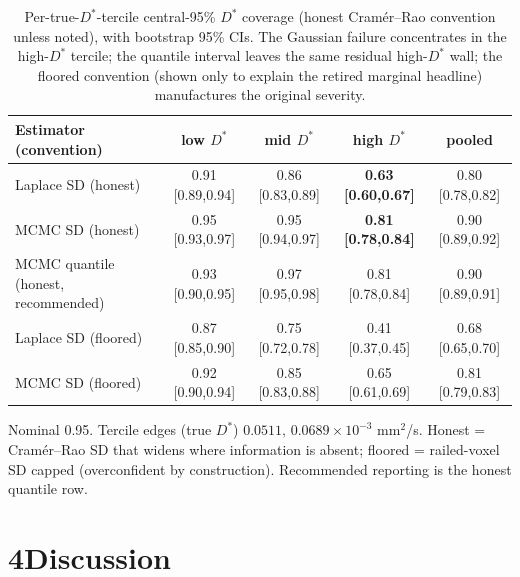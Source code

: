 \documentclass[11pt]{article}
\newcommand{\Dstar}{\ensuremath{D^{*}}}
\begin{document}
\begin{table}[htbp]
\centering
\caption{Per-true-\Dstar{}-tercile central-95\% \Dstar{} coverage (honest Cram\'er--Rao
convention unless noted), with bootstrap 95\% CIs. The Gaussian failure concentrates in
the high-\Dstar{} tercile; the quantile interval leaves the same residual high-\Dstar{}
wall; the floored convention (shown only to explain the retired marginal headline)
manufactures the original severity.}
\small
\begin{tabular}{lcccc}
\toprule
Estimator (convention) & low \Dstar{} & mid \Dstar{} & \textbf{high \Dstar{}} & pooled \\
\midrule
Laplace SD (honest) & 0.91 [0.89,0.94] & 0.86 [0.83,0.89] & \textbf{0.63 [0.60,0.67]} & 0.80 [0.78,0.82] \\
MCMC SD (honest) & 0.95 [0.93,0.97] & 0.95 [0.94,0.97] & \textbf{0.81 [0.78,0.84]} & 0.90 [0.89,0.92] \\
\rowcolor{yellow!25} MCMC quantile (honest, recommended) & 0.93 [0.90,0.95] & 0.97 [0.95,0.98] & 0.81 [0.78,0.84] & 0.90 [0.89,0.91] \\
\midrule
Laplace SD (floored) & 0.87 [0.85,0.90] & 0.75 [0.72,0.78] & 0.41 [0.37,0.45] & 0.68 [0.65,0.70] \\
MCMC SD (floored) & 0.92 [0.90,0.94] & 0.85 [0.83,0.88] & 0.65 [0.61,0.69] & 0.81 [0.79,0.83] \\
\bottomrule
\end{tabular}
\par\vspace{0.4em}
{\footnotesize Nominal 0.95. Tercile edges (true \Dstar{}) $0.0511,\,0.0689\times10^{-3}$
mm$^2$/s. Honest = Cram\'er--Rao SD that widens where information is absent; floored =
railed-voxel SD capped (overconfident by construction). Recommended reporting is the
honest quantile row.}
\end{table}

\section*{4\quad Discussion}
\end{document}
